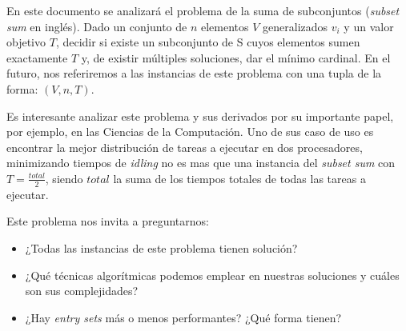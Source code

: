 En este documento se analizará el problema de la suma de subconjuntos (\textit{subset sum} en inglés). Dado un conjunto de $n$ elementos $V$ generalizados $v_{i}$ y un valor objetivo $T$, decidir si existe un subconjunto de S cuyos elementos sumen exactamente $T$ y, de existir múltiples soluciones, dar el mínimo cardinal. En el futuro, nos referiremos a las instancias de este problema con una tupla de la forma: $(V, n, T)$.

\vskip 8pt

Es interesante analizar este problema y sus derivados por su importante papel, por ejemplo, en las Ciencias de la Computación. Uno de sus caso de uso es encontrar la mejor distribución de tareas a ejecutar en dos procesadores, minimizando tiempos de \textit{idling} no es mas que una instancia del \textit{subset sum} con $T = \frac{total}{2}$, siendo $total$ la suma de los tiempos totales de todas las tareas a ejecutar.

\vskip 8pt

Este problema nos invita a preguntarnos:
\begin{itemize}
	\item ¿Todas las instancias de este problema tienen solución?
	\item ¿Qué técnicas algorítmicas podemos emplear en nuestras soluciones y cuáles son sus complejidades?
	\item ¿Hay \textit{entry sets} más o menos performantes? ¿Qué forma tienen?
\end{itemize}